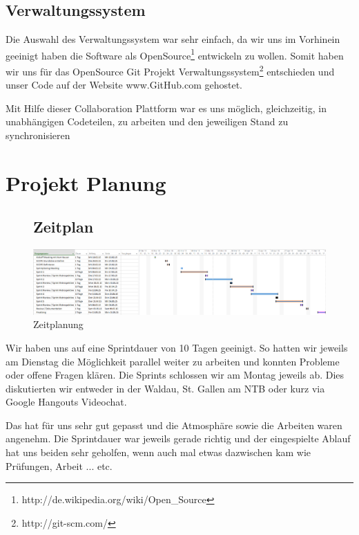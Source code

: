 \documentclass{article}
\begin{document}
\subsection{Verwaltungssystem}
Die Auswahl des Verwaltungssystem war sehr einfach, da wir uns im Vorhinein geeinigt haben die Software als OpenSource\footnote{http://de.wikipedia.org/wiki/Open\_Source} entwickeln zu wollen. Somit haben wir uns für das OpenSource Git Projekt Verwaltungssystem\footnote{http://git-scm.com/} entschieden und unser Code auf der Website www.GitHub.com gehostet.

Mit Hilfe dieser Collaboration Plattform war es uns möglich, gleichzeitig, in unabhängigen Codeteilen, zu arbeiten und den jeweiligen Stand zu synchronisieren

\newpage


\section{Projekt Planung}
\label{sec:projektplanung}
	\begin{figure}[h]
		\subsection{Zeitplan}
		\bigskip
		\begin{center}
			\centering
			\includegraphics[width=0.8\paperwidth]{PJPlanung}
			\caption{Zeitplanung}
		\end{center}
	\end{figure}	
	
Wir haben uns auf eine Sprintdauer von 10 Tagen geeinigt. So hatten wir jeweils am Dienstag die Möglichkeit parallel weiter zu arbeiten und konnten Probleme oder offene Fragen klären. Die Sprints schlossen wir am Montag jeweils ab. Dies diskutierten wir entweder in der Waldau, St. Gallen am NTB oder kurz via Google Hangouts Videochat.

Das hat für uns sehr gut gepasst und die Atmosphäre sowie die Arbeiten waren angenehm. Die Sprintdauer war jeweils gerade richtig und der eingespielte Ablauf hat uns beiden sehr geholfen, wenn auch mal etwas dazwischen kam wie Prüfungen, Arbeit ... etc.
	
\end{document}
